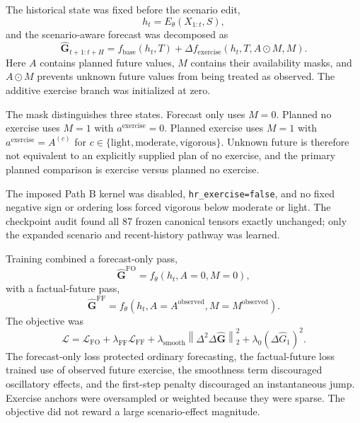 The historical state was fixed before the scenario edit,
\begin{equation}
  h_t = E_{\theta}\left(X_{1:t},S\right),
  \label{eq:exercise_history_state}
\end{equation}
and the scenario-aware forecast was decomposed as
\begin{equation}
  \widehat{\mathbf G}_{t+1:t+H}
  = f_{\mathrm{base}}\left(h_t,T\right)
  + \Delta f_{\mathrm{exercise}}
    \left(h_t,T,A\odot M,M\right).
  \label{eq:exercise_scenario_decomposition}
\end{equation}
Here $A$ contains planned future values, $M$ contains their availability
masks, and $A\odot M$ prevents unknown future values from being treated as
observed. The additive exercise branch was initialized at zero.

The mask distinguishes three states. Forecast only uses $M=0$. Planned no
exercise uses $M=1$ with $a^{\mathrm{exercise}}=0$. Planned exercise uses
$M=1$ with $a^{\mathrm{exercise}}=A^{(c)}$ for
$c\in\{\mathrm{light},\mathrm{moderate},\mathrm{vigorous}\}$. Unknown future
is therefore not equivalent to an explicitly supplied plan of no exercise, and
the primary planned comparison is exercise versus planned no exercise.

The imposed Path B kernel was disabled, \texttt{hr\_exercise=false}, and no
fixed negative sign or ordering loss forced vigorous below moderate or light.
The checkpoint audit found all 87 frozen canonical tensors exactly unchanged;
only the expanded scenario and recent-history pathway was learned.

Training combined a forecast-only pass,
\begin{equation}
  \widehat{\mathbf G}^{\mathrm{FO}}
  = f_{\theta}\left(h_t,A=0,M=0\right),
\end{equation}
with a factual-future pass,
\begin{equation}
  \widehat{\mathbf G}^{\mathrm{FF}}
  = f_{\theta}\left(h_t,A=A^{\mathrm{observed}},
      M=M^{\mathrm{observed}}\right).
\end{equation}
The objective was
\begin{equation}
  \mathcal L
  = \mathcal L_{\mathrm{FO}}
  + \lambda_{\mathrm{FF}}\mathcal L_{\mathrm{FF}}
  + \lambda_{\mathrm{smooth}}
      \left\|\Delta^2\Delta\widehat{\mathbf G}\right\|_2^2
  + \lambda_0\left(\Delta\widehat G_1\right)^2.
  \label{eq:exercise_training_objective}
\end{equation}
The forecast-only loss protected ordinary forecasting, the factual-future loss
trained use of observed future exercise, the smoothness term discouraged
oscillatory effects, and the first-step penalty discouraged an instantaneous
jump. Exercise anchors were oversampled or weighted because they were sparse.
The objective did not reward a large scenario-effect magnitude.

